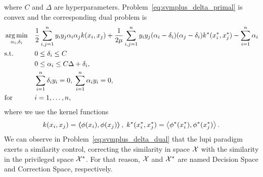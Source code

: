 where $C$ and $\Delta$ are hyperparameters.
Problem~\eqref{eq:svmplus_delta_primal} is convex and the corresponding dual problem is
\begin{equation}\label{eq:svmplus_delta_dual}
    \begin{aligned}
        & \argmin_{\alpha_i, \delta_i} 
        & & \frac{1}{2} \sum_{i, j=1}^\nsamples y_i y_j \alpha_i \alpha_j k(x_i, x_j) +\frac{1}{2 \mu} \sum_{i, j=1}^\nsamples y_i y_j (\alpha_i - \delta_i) (\alpha_j - \delta_i) k^*(x^*_i, x^*_j)  - \sum_{i=1}^\nsamples \alpha_i \\
        & \text{s.t.}
        & & 0 \leq \delta_i \leq C  \\
        & & & 0 \leq \alpha_i \leq C \Delta + \delta_i, \\
        & & & \sum_{i=1}^{\nsamples}{\delta_i y_i} = 0, \; 
        \sum_{i=1}^{\nsamples}{\alpha_i y_i} = 0, \\
        & \text{for } & & i=1, \ldots, \nsamples,
        \end{aligned}
\end{equation}
where we use the kernel functions
$$k(x_i, x_j) = \bm{\left\langle} \phi(x_i), \phi(x_j) \bm{\right\rangle}, \; k^*(x^*_i, x^*_j) = \bm{\left\langle} \phi^*(x^*_i), \phi^*(x^*_j) \bm{\right\rangle}.$$ 
We can observe in Problem~\eqref{eq:svmplus_delta_dual} that the \acrshort{lupi} paradigm exerts a similarity control, correcting the similarity in space $\mathcal{X}$ with the similarity in the privileged space $\mathcal{X}^*$. For that reason, $\mathcal{X}$ and $\mathcal{X}^*$ are named Decision Space and Correction Space, respectively.


